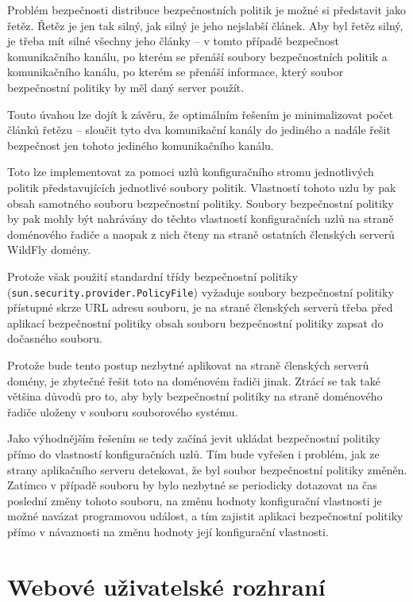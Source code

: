 Problém bezpečnosti distribuce bezpečnostních politik je možné si představit jako řetěz. Řetěz je jen tak silný, jak silný je jeho nejslabší článek. Aby byl řetěz silný, je třeba mít silné všechny jeho články -- v tomto případě bezpečnost komunikačního kanálu, po kterém se přenáší soubory bezpečnostních politik a komunikačního kanálu, po kterém se přenáší informace, který soubor bezpečnostní politiky by měl daný server použít.

Touto úvahou lze dojít k závěru, že optimálním řešením je minimalizovat počet článků řetězu -- sloučit tyto dva komunikační kanály do jediného a nadále řešit bezpečnost jen tohoto jediného komunikačního kanálu.

Toto lze implementovat za pomoci uzlů konfiguračního stromu jednotlivých politik představujících jednotlivé soubory politik. Vlastností tohoto uzlu by pak obsah samotného souboru bezpečnostní politiky. Soubory bezpečnostní politiky by pak mohly být nahrávány do těchto vlastností konfiguračních uzlů na straně doménového řadiče a naopak z nich čteny na straně ostatních členských serverů WildFly domény.

Protože však použití standardní třídy bezpečnostní politiky ({\tt sun.security.provider.PolicyFile}) vyžaduje soubory bezpečnostní politiky přístupné skrze URL adresu souboru, je na straně členských serverů třeba před aplikací bezpečnostní politiky obsah souboru bezpečnostní politiky zapsat do dočasného souboru.

Protože bude tento postup nezbytné aplikovat na straně členských serverů domény, je zbytečné řešit toto na doménovém řadiči jinak. Ztrácí se tak také většina důvodů pro to, aby byly bezpečnostní politiky na straně doménového řadiče uloženy v souboru souborového systému.

Jako výhodnějším řešením se tedy začíná jevit ukládat bezpečnostní politiky přímo do vlastností konfiguračních uzlů. Tím bude vyřešen i problém, jak ze strany aplikačního serveru detekovat, že byl soubor bezpečnostní politiky změněn. Zatímco v případě souboru by bylo nezbytné se periodicky dotazovat na čas poslední změny tohoto souboru, na změnu hodnoty konfigurační vlastnosti je možné navázat programovou událost, a tím zajistit aplikaci bezpečnostní politiky přímo v návaznosti na změnu hodnoty její konfigurační vlastnosti.

\section{Webové uživatelské rozhraní} \label{navrhGUI}

